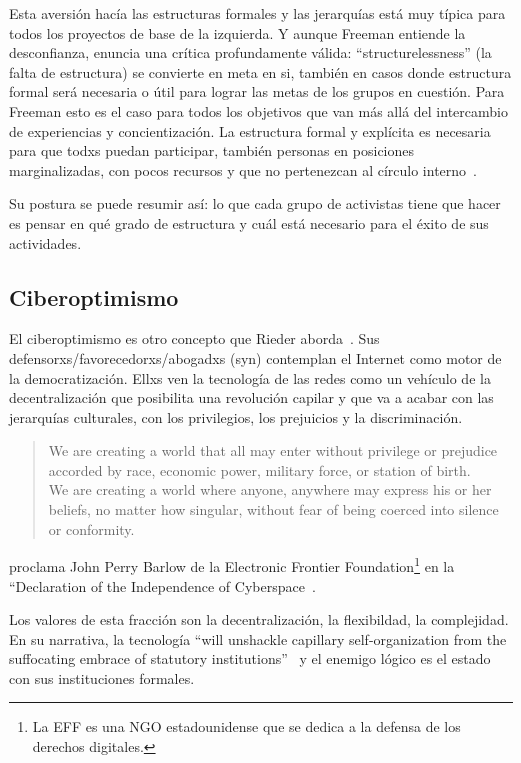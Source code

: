 Esta aversión hacía las estructuras formales y las jerarquías está muy típica para todos los proyectos de base de la izquierda.
Y aunque Freeman entiende la desconfianza, enuncia una crítica profundamente válida:
``structurelessness'' (la falta de estructura) se convierte en meta en si, también en casos donde estructura formal será necesaria o útil para lograr las metas de los grupos en cuestión.
Para Freeman esto es el caso para todos los objetivos que van más allá del intercambio de experiencias y concientización.
La estructura formal y explícita es necesaria para que todxs puedan participar, también personas en posiciones marginalizadas, con pocos recursos y que no pertenezcan al círculo interno~\autocite{Freeman1970}.

Su postura se puede resumir así: lo que cada grupo de activistas tiene que hacer es pensar en qué grado de estructura y cuál está necesario para el éxito de sus actividades.

\subsection{Ciberoptimismo}

El ciberoptimismo es otro concepto que Rieder aborda~\autocite{Rieder2012}.
Sus defensorxs/favorecedorxs/abogadxs (syn) contemplan el Internet como motor de la democratización.
Ellxs ven la tecnología de las redes como un vehículo de la decentralización que posibilita una revolución capilar y que va a acabar con las jerarquías culturales, con los privilegios, los prejuicios y la discriminación.

\begin{quotation}
We are creating a world that all may enter without privilege or prejudice accorded by race, economic power, military force, or station of birth.\\
We are creating a world where anyone, anywhere may express his or her beliefs, no matter how singular, without fear of being coerced into silence or conformity.
\end{quotation}
proclama John Perry Barlow de la Electronic Frontier Foundation\footnote{La EFF es una NGO estadounidense que se dedica a la defensa de los derechos digitales.} en la ``Declaration of the Independence of Cyberspace~\autocite{Barlow1996}.

Los valores de esta fracción  son la decentralización, la flexibildad, la complejidad.
En su narrativa, la tecnología ``will unshackle capillary self-organization from the suffocating embrace of statutory institutions''~\autocite{Rieder2012} y el enemigo lógico es el estado con sus instituciones formales.

